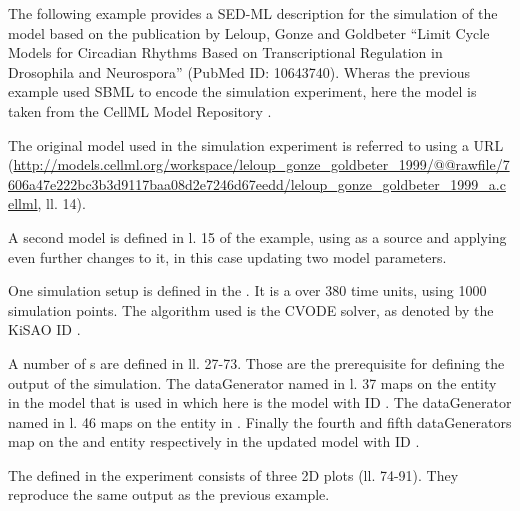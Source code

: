 The following example provides a SED-ML description for the simulation of the model based on the publication by Leloup, Gonze and Goldbeter ``Limit Cycle Models for Circadian Rhythms Based on Transcriptional Regulation in Drosophila and Neurospora'' (PubMed ID: 10643740).
Wheras the previous example used SBML to encode the simulation experiment, here the model is taken from the CellML Model Repository \citep{LLH+08}. 

The original model used in the simulation experiment is referred to using a URL (\url{http://models.cellml.org/workspace/leloup_gonze_goldbeter_1999/@@rawfile/7606a47e222bc3b3d9117baa08d2e7246d67eedd/leloup_gonze_goldbeter_1999_a.cellml}, ll. 14).

A second model is defined in l. 15 of the example, using  as a source and applying even further changes to it, in this case updating two model parameters.

One simulation setup is defined in the . It is a  over 380 time units, using 1000 simulation points. The algorithm used is the CVODE solver, as denoted by the KiSAO ID .

A number of s are defined in ll. 27-73. Those are the prerequisite for defining the output of the simulation. The dataGenerator named  in l. 37 maps on the  entity in the model that is used in  which here is the model with ID . The dataGenerator named  in l. 46 maps on the  entity in . Finally  the fourth and fifth dataGenerators map on the  and  entity respectively in the updated model with ID .

The  defined in the experiment consists of three 2D plots (ll. 74-91). They reproduce the same output as the previous example. 

%
%


